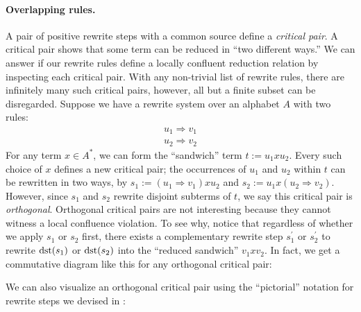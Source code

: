 \documentclass[../generics]{subfiles}
\begin{document}
\paragraph{Overlapping rules.} A pair of positive rewrite steps with a common source define a \emph{critical pair}. A critical pair shows that some term can be reduced in ``two different ways.'' We can answer if our rewrite rules define a locally confluent reduction relation by inspecting each critical pair. With any non-trivial list of rewrite rules, there are infinitely many such critical pairs, however, all but a finite subset can be disregarded. Suppose we have a rewrite system over an alphabet $A$ with two rules:
\begin{gather*}
u_1\Rightarrow v_1\\
u_2\Rightarrow v_2
\end{gather*}
For any term $x\in A^*$, we can form the ``sandwich'' term $t := u_1xu_2$. Every such choice of $x$ defines a new critical pair; the occurrences of $u_1$ and $u_2$ within $t$ can be rewritten in two ways, by $s_1 := (u_1\Rightarrow v_1)xu_2$ and $s_2 := u_1x(u_2\Rightarrow v_2)$. However, since $s_1$ and $s_2$ rewrite disjoint subterms of $t$, we say this critical pair is \emph{orthogonal}. Orthogonal critical pairs are not interesting because they cannot witness a local confluence violation. To see why, notice that regardless of whether we apply $s_1$ or $s_2$ first, there exists a complementary rewrite step $s_1^\prime$ or $s_2^\prime$ to rewrite $\operatorname{dst}(s_1)$ or $\operatorname{dst}(s_2)$ into the ``reduced sandwich'' $v_1xv_2$. In fact, we get a commutative diagram like this for any orthogonal critical pair:
\begin{center}
\end{center}
We can also visualize an orthogonal critical pair using the ``pictorial'' notation for rewrite steps we devised in :
\end{document}
